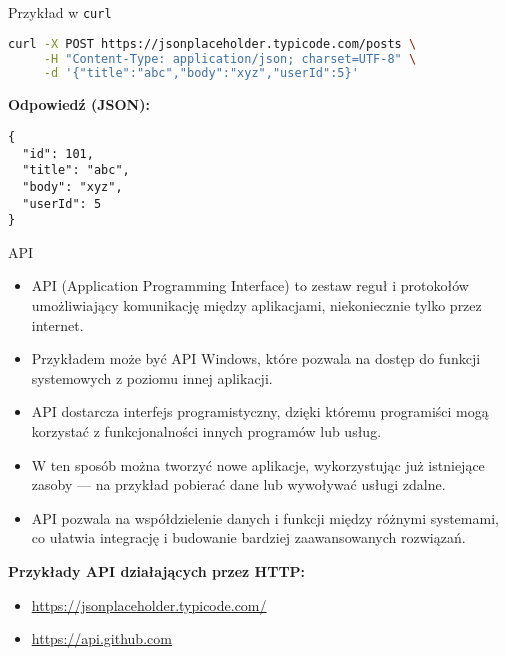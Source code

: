 \documentclass[10pt,compress,usenames,dvipsnames,aspectratio=169]{beamer}
\begin{document}
\begin{frame}[fragile]{Przykład w \texttt{curl}}
  \begin{lstlisting}[style=dark, language=bash, basicstyle=\ttfamily\scriptsize\color{fgcode}, numbers=none, xleftmargin=1em, xrightmargin=1em]
curl -X POST https://jsonplaceholder.typicode.com/posts \
     -H "Content-Type: application/json; charset=UTF-8" \
     -d '{"title":"abc","body":"xyz","userId":5}'
  \end{lstlisting}


  \vspace{1ex}
  \textbf{Odpowiedź (JSON):}
  \begin{verbatim}
{
  "id": 101,
  "title": "abc",
  "body": "xyz",
  "userId": 5
}
  \end{verbatim}
\end{frame}


\begin{frame}{API}
  \begin{itemize}
    \item API (Application Programming Interface) to zestaw reguł i protokołów umożliwiający komunikację między aplikacjami, niekoniecznie tylko przez internet.
    \item Przykładem może być API Windows, które pozwala na dostęp do funkcji systemowych z poziomu innej aplikacji.
    \item API dostarcza interfejs programistyczny, dzięki któremu programiści mogą korzystać z funkcjonalności innych programów lub usług.
    \item W ten sposób można tworzyć nowe aplikacje, wykorzystując już istniejące zasoby — na przykład pobierać dane lub wywoływać usługi zdalne.
    \item API pozwala na współdzielenie danych i funkcji między różnymi systemami, co ułatwia integrację i budowanie bardziej zaawansowanych rozwiązań.
  \end{itemize}

  \vspace{1ex}
  \textbf{Przykłady API działających przez HTTP:}
  \begin{itemize}
    \item \url{https://jsonplaceholder.typicode.com/}
    \item \url{https://api.github.com}
  \end{itemize}
\end{frame}
\end{document}
